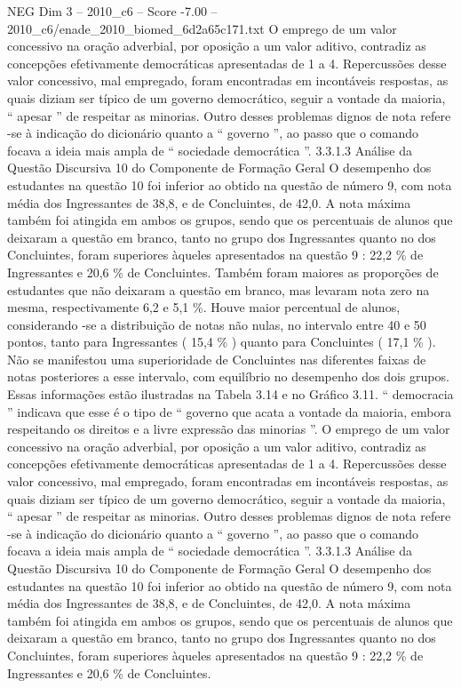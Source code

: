 \begin{textsample}{NEG Dim 3 – 2010\_c6 – Score -7.00 – 2010\_c6/enade\_2010\_biomed\_6d2a65c171.txt}
O emprego de um valor concessivo na oração adverbial, por oposição a um valor aditivo, contradiz as concepções efetivamente democráticas apresentadas de 1 a 4.
Repercussões desse valor concessivo, mal empregado, foram encontradas em incontáveis respostas, as quais diziam ser típico de um governo democrático, seguir a vontade da maioria, “ apesar ” de respeitar as minorias.
Outro desses problemas dignos de nota refere -se à indicação do dicionário quanto a “ governo ”, ao passo que o comando focava a ideia mais ampla de “ sociedade democrática ”. 3.3.1.3 Análise da Questão Discursiva 10 do Componente de Formação Geral O desempenho dos estudantes na questão 10 foi inferior ao obtido na questão de número 9, com nota média dos Ingressantes de 38,8, e de Concluintes, de 42,0.
A nota máxima também foi atingida em ambos os grupos, sendo que os percentuais de alunos que deixaram a questão em branco, tanto no grupo dos Ingressantes quanto no dos Concluintes, foram superiores àqueles apresentados na questão 9 : 22,2 \% de Ingressantes e 20,6 \% de Concluintes.
Também foram maiores as proporções de estudantes que não deixaram a questão em branco, mas levaram nota zero na mesma, respectivamente 6,2 e 5,1 \%.
Houve maior percentual de alunos, considerando -se a distribuição de notas não nulas, no intervalo entre 40 e 50 pontos, tanto para Ingressantes ( 15,4 \% ) quanto para Concluintes ( 17,1 \% ).
Não se manifestou uma superioridade de Concluintes nas diferentes faixas de notas posteriores a esse intervalo, com equilíbrio no desempenho dos dois grupos.
Essas informações estão ilustradas na Tabela 3.14 e no Gráfico 3.11. “ democracia ” indicava que esse é o tipo de “ governo que acata a vontade da maioria, embora respeitando os direitos e a livre expressão das minorias ”.
O emprego de um valor concessivo na oração adverbial, por oposição a um valor aditivo, contradiz as concepções efetivamente democráticas apresentadas de 1 a 4.
Repercussões desse valor concessivo, mal empregado, foram encontradas em incontáveis respostas, as quais diziam ser típico de um governo democrático, seguir a vontade da maioria, “ apesar ” de respeitar as minorias.
Outro desses problemas dignos de nota refere -se à indicação do dicionário quanto a “ governo ”, ao passo que o comando focava a ideia mais ampla de “ sociedade democrática ”. 3.3.1.3 Análise da Questão Discursiva 10 do Componente de Formação Geral O desempenho dos estudantes na questão 10 foi inferior ao obtido na questão de número 9, com nota média dos Ingressantes de 38,8, e de Concluintes, de 42,0.
A nota máxima também foi atingida em ambos os grupos, sendo que os percentuais de alunos que deixaram a questão em branco, tanto no grupo dos Ingressantes quanto no dos Concluintes, foram superiores àqueles apresentados na questão 9 : 22,2 \% de Ingressantes e 20,6 \% de Concluintes.

\end{textsample}
